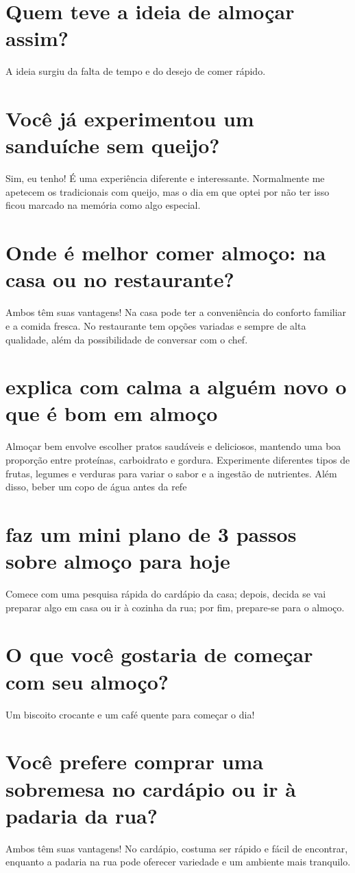 \documentclass[11pt,a4paper]{article}
\begin{document}
\section{Quem teve a ideia de almoçar assim?}
A ideia surgiu da falta de tempo e do desejo de comer rápido.

\section{Você já experimentou um sanduíche sem queijo?}
Sim, eu tenho! É uma experiência diferente e interessante. Normalmente me apetecem os tradicionais com queijo, mas o dia em que optei por não ter isso ficou marcado na memória como algo especial.

\section{Onde é melhor comer almoço: na casa ou no restaurante?}
Ambos têm suas vantagens! Na casa pode ter a conveniência do conforto familiar e a comida fresca. No restaurante tem opções variadas e sempre de alta qualidade, além da possibilidade de conversar com o chef.

\section{explica com calma a alguém novo o que é bom em almoço}
Almoçar bem envolve escolher pratos saudáveis e deliciosos, mantendo uma boa proporção entre proteínas, carboidrato e gordura. Experimente diferentes tipos de frutas, legumes e verduras para variar o sabor e a ingestão de nutrientes. Além disso, beber um copo de água antes da refe

\section{faz um mini plano de 3 passos sobre almoço para hoje}
Comece com uma pesquisa rápida do cardápio da casa; depois, decida se vai preparar algo em casa ou ir à cozinha da rua; por fim, prepare-se para o almoço.

\section{O que você gostaria de começar com seu almoço?}
Um biscoito crocante e um café quente para começar o dia!

\section{Você prefere comprar uma sobremesa no cardápio ou ir à padaria da rua?}
Ambos têm suas vantagens! No cardápio, costuma ser rápido e fácil de encontrar, enquanto a padaria na rua pode oferecer variedade e um ambiente mais tranquilo.
\end{document}
